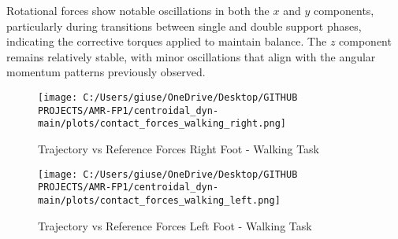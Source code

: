 \documentclass[main.tex]{subfiles}
\begin{document}
\begin{sloppypar}
Rotational forces show notable oscillations in both the $x$ and $y$ components, particularly during transitions between single and double support phases, indicating the corrective torques applied to maintain balance. The $z$ component remains relatively stable, with minor oscillations that align with the angular momentum patterns previously observed.
\begin{figure}[htbp]
    \centering
    \texttt{[image: C:/Users/giuse/OneDrive/Desktop/GITHUB PROJECTS/AMR-FP1/centroidal\_dyn-main/plots/contact\_forces\_walking\_right.png]}
    \caption{Trajectory vs Reference Forces Right Foot - Walking Task}
    \label{fig:contact_forces_walking_right}
    
    \vspace{1em} %

    \texttt{[image: C:/Users/giuse/OneDrive/Desktop/GITHUB PROJECTS/AMR-FP1/centroidal\_dyn-main/plots/contact\_forces\_walking\_left.png]}
    \caption{Trajectory vs Reference Forces Left Foot - Walking Task}
    \label{fig:contact_forces_walking_left}
\end{figure}
\end{sloppypar}
\end{document}
